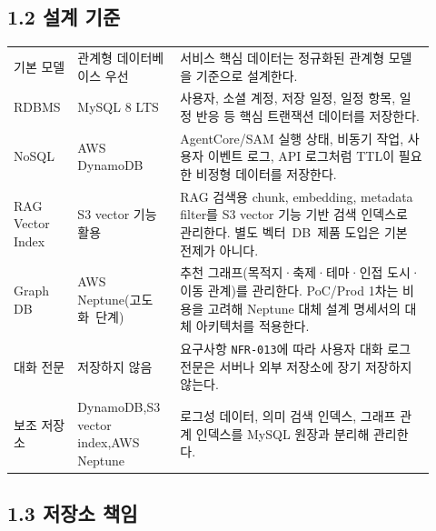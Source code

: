 \documentclass[12pt,a4paper]{article}
\newcommand{\DocNeedspace}[1]{\par\ifdim\dimexpr\pagegoal-\pagetotal\relax<#1\newpage\fi}
\begin{document}
\DocNeedspace{8\baselineskip}
\subsection*{1.2 설계 기준}


\DocNeedspace{20\baselineskip}
\begin{small}
\begin{longtable}{@{}>{\centering\arraybackslash}m{0.131\linewidth}>{\RaggedRight\arraybackslash}m{0.225\linewidth}>{\RaggedRight\arraybackslash}m{0.563\linewidth}@{}}
\toprule
\multicolumn{1}{>{\centering\arraybackslash}m{0.131\linewidth}}{\textbf{항목}} & \multicolumn{1}{>{\centering\arraybackslash}m{0.225\linewidth}}{\textbf{결정}} & \multicolumn{1}{>{\centering\arraybackslash}m{0.563\linewidth}}{\textbf{비고}} \\
\midrule
\endhead
기본 모델 & 관계형 데이터베이스 우선 & 서비스 핵심 데이터는 정규화된 관계형 모델을 기준으로 설계한다. \\
RDBMS & MySQL 8 LTS & 사용자, 소셜 계정, 저장 일정, 일정 항목, 일정 반응 등 핵심 트랜잭션 데이터를 저장한다. \\
NoSQL & AWS DynamoDB & AgentCore/SAM 실행 상태, 비동기 작업, 사용자 이벤트 로그, API 로그처럼 TTL이 필요한 비정형 데이터를 저장한다. \\
RAG Vector Index & S3 vector 기능 활용 & RAG 검색용 chunk, embedding, metadata filter를 S3 vector 기능 기반 검색 인덱스로 관리한다. 별도 \mbox{벡터 DB 제품} 도입은 기본 전제가 아니다. \\
Graph DB & AWS Neptune\newline(\mbox{고도화 단계}) & 추천 그래프(목적지·축제·테마·인접 도시·이동 관계)를 관리한다. PoC/Prod 1차는 비용을 고려해 Neptune 대체 설계 명세서의 대체 아키텍처를 적용한다. \\
대화 전문 & 저장하지 않음 & 요구사항 \texttt{NFR-\allowbreak{}013}에 따라 사용자 대화 로그 전문은 서버나 외부 저장소에 장기 저장하지 않는다. \\
보조 저장소 & DynamoDB,\newline S3 vector index,\newline AWS Neptune & 로그성 데이터, 의미 검색 인덱스, 그래프 관계 인덱스를 MySQL 원장과 분리해 관리한다. \\
\bottomrule
\end{longtable}
\end{small}


\newpage

\DocNeedspace{24\baselineskip}
\subsection*{1.3 저장소 책임}
\end{document}
